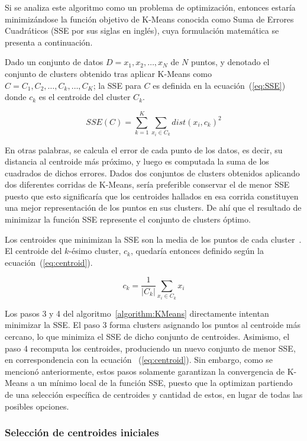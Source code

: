 Si se analiza este algoritmo como un problema de optimización, entonces estaría minimizándose la función objetivo de K-Means conocida como Suma de Errores Cuadráticos (SSE por sus siglas en inglés), cuya formulación matemática se presenta a continuación.

Dado un conjunto de datos $D={x_1,x_2,\dots,x_N}$ de $N$ puntos, y denotado el conjunto de clusters obtenido tras aplicar K-Means como $C={C_1,C_2,\dots,C_k,\dots,C_K}$;
la SSE para $C$ es definida en la ecuación~(\ref{eq:SSE}) donde $c_k$ es el centroide del cluster $C_k$.

\begin{equation}
    \label{eq:SSE}
    SSE(C)=\sum_{k=1}^{K}{\sum_{x_{i}\in C_k}{dist(x_i, c_k)^2}}
\end{equation}

En otras palabras, se calcula el error de cada punto de los datos, es decir, su distancia al centroide más próximo, y luego es computada la suma de los cuadrados de dichos errores.
Dados dos conjuntos de clusters obtenidos aplicando dos diferentes corridas de K-Means, sería preferible conservar el de menor SSE puesto que esto significaría que los centroides hallados en esa corrida constituyen una mejor representación de los puntos en sus clusters.
De ahí que el resultado de minimizar la función SSE represente el conjunto de clusters óptimo.

Los centroides que minimizan la SSE son la media de los puntos de cada cluster~\cite{Tan05}.
El centroide del $k$-ésimo cluster, $c_k$, quedaría entonces definido según la ecuación~(\ref{eq:centroid}).

\begin{equation}
    \label{eq:centroid}
    c_{k}=\frac{1}{|C_k|}\sum_{x_{i}\in C_k}{x_i}
\end{equation}

Los pasos 3 y 4 del algoritmo~\ref{algorithm:KMeans} directamente intentan minimizar la SSE. El paso 3 forma clusters asignando los puntos al centroide más cercano, lo que minimiza el SSE de dicho conjunto de centroides.
Asimismo, el paso 4 recomputa los centroides, produciendo un nuevo conjunto de menor SSE, en correspondencia con la ecuación ~(\ref{eq:centroid}).
Sin embargo, como se mencionó anteriormente, estos pasos solamente garantizan la convergencia de K-Means a un mínimo local de la función SSE, puesto que la optimizan partiendo de una selección específica de centroides y cantidad de estos, en lugar de todas las posibles opciones.

\subsubsection{Selección de centroides iniciales}

